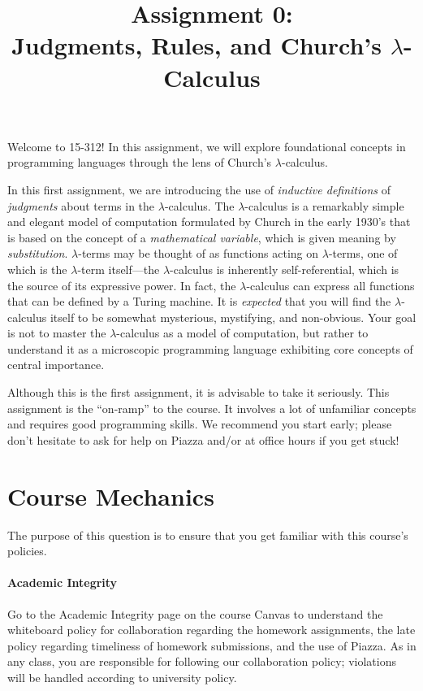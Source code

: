 \documentclass[11pt]{article}
\title{Assignment 0: \\
       Judgments, Rules, and Church's $\lambda$-Calculus}
\begin{document}
\maketitle

Welcome to 15-312!
In this assignment, we will explore foundational concepts in programming languages through the lens of Church's $\lambda$-calculus.

In this first assignment, we are introducing the use of \emph{inductive definitions} of
\emph{judgments} about terms in the $\lambda$-calculus.
The $\lambda$-calculus is a remarkably simple and elegant model of computation formulated by Church in the early 1930's that is based on the concept of a \emph{mathematical variable}, which is given meaning by \emph{substitution}.
$\lambda$-terms may be thought of as functions acting on $\lambda$-terms, one of which is the $\lambda$-term itself---the $\lambda$-calculus is inherently self-referential, which is the source of its expressive power.
In fact, the $\lambda$-calculus can express all functions that can be defined by a Turing machine.
It is \emph{expected} that you will find the $\lambda$-calculus itself to be somewhat mysterious, mystifying, and non-obvious.
Your goal is not to master the $\lambda$-calculus as a model of computation, but rather to understand it as a microscopic programming language exhibiting core concepts of central importance.

Although this is the first assignment, it is advisable to take it seriously.
This assignment is the ``on-ramp'' to the course.
It involves a lot of unfamiliar concepts and requires good programming skills.
We recommend you start early; please don't hesitate to ask for help on Piazza and/or at office hours if you get stuck!


\section{Course Mechanics}

The purpose of this question is to ensure that you get familiar with this course's policies.

\paragraph{Academic Integrity}
Go to the Academic Integrity page on the course Canvas to understand the whiteboard policy for collaboration regarding the homework assignments, the late policy regarding timeliness of homework submissions, and the use of Piazza.
As in any class, you are responsible for following our collaboration policy; violations will be handled according to university policy.
\end{document}
